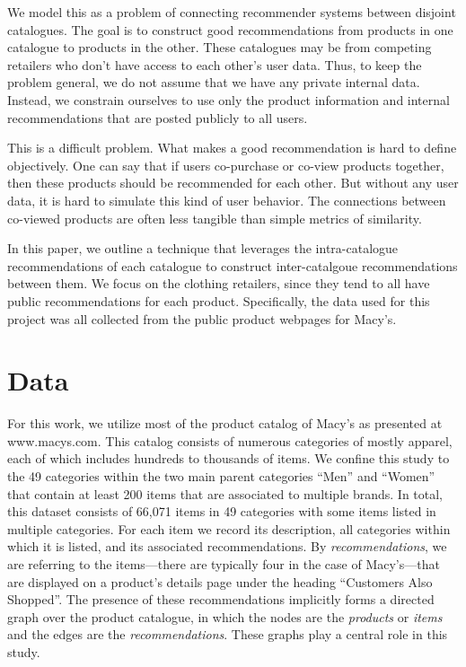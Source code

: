 \documentclass[11pt]{article}
\begin{document}
We model this as a problem of connecting recommender systems between disjoint
catalogues. The goal is to construct good recommendations from products in one
catalogue to products in the other. These catalogues may be from competing
retailers who don't have access to each other's user data. Thus, to keep the
problem general, we do not assume that we have any private internal data.
Instead, we constrain ourselves to use only the product information and internal
recommendations that are posted publicly to all users.

This is a difficult problem. What makes a good recommendation is hard to define
objectively. One can say that if users co-purchase or co-view products together,
then these products should be recommended for each other. But without any user
data, it is hard to simulate this kind of user behavior. The connections between
co-viewed products are often less tangible than simple metrics of similarity. 

In this paper, we outline a technique that leverages the intra-catalogue
recommendations of each catalogue to construct inter-catalgoue recommendations
between them. We focus on the clothing retailers, since they tend to all have
public recommendations for each product. Specifically, the data used for this
project was all collected from the public product webpages for Macy's.

\section*{Data}
For this work, we utilize most of the product catalog of Macy's as presented at
www.macys.com. This catalog consists of numerous categories of mostly apparel,
each of which includes hundreds to thousands of items. We confine this study to
the 49 categories within the two main parent categories ``Men'' and ``Women''
that contain at least 200 items that are associated to multiple brands. In
total, this dataset consists of 66,071 items in 49 categories with some items
listed in multiple categories. For each item we record its description, all
categories within which it is listed, and its associated recommendations. By
{\em recommendations}, we are referring to the items---there are typically four
in the case of Macy's---that are displayed on a product's details page under the
heading ``Customers Also Shopped''. The presence of these recommendations
implicitly forms a directed graph over the product catalogue, in which the nodes
are the {\em products} or {\em items} and the edges are the {\em
recommendations}. These graphs play a central role in this study.
\end{document}
